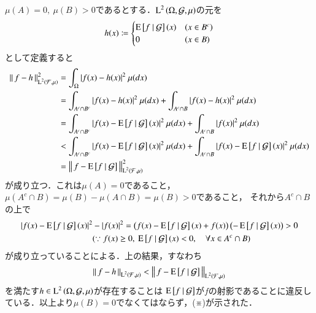 \begin{prf}
\begin{description}
				$\mu(A) = 0,\ \mu(B) > 0$であるとする．$\operatorname{L}^{2} \left(\Omega, \mathcal{G},\mu\right)$の元を
				\begin{align}
					h(x) \coloneqq
					\begin{cases}
						\operatorname{E} \left[ f \ \middle|\ \mathcal{G} \right](x) & (x \in B^c) \\
						0 & (x \in B)
					\end{cases}
				\end{align}
				として定義すると
				\begin{align}
					\Norm{f - h}{\Lp{2}{\mathcal{F},\mu}}^2 &= \int_{\Omega} |f(x) - h(x)|^2\ \mu(dx) \\
					&= \int_{A^c \cap B^c} |f(x) - h(x)|^2\ \mu(dx) + \int_{A^c \cap B} |f(x) - h(x)|^2\ \mu(dx) \\
					&= \int_{A^c \cap B^c} |f(x) - \cexp{f}{\mathcal{G}}(x)|^2\ \mu(dx) + \int_{A^c \cap B} |f(x)|^2\ \mu(dx) \\
					&< \int_{A^c \cap B^c} |f(x) - \cexp{f}{\mathcal{G}}(x)|^2\ \mu(dx) + \int_{A^c \cap B} |f(x) - \cexp{f}{\mathcal{G}}(x)|^2\ \mu(dx) \\
					&= \Norm{f - \cexp{f}{\mathcal{G}}}{\Lp{2}{\mathcal{F},\mu}}^2
				\end{align}
				が成り立つ．これは$\mu(A) = 0$であること，$\mu(A^c \cap B) = \mu(B) - \mu(A \cap B) = \mu(B) > 0$であること，
				それから$A^c \cap B$の上で
				\begin{align}
					|f(x) - \cexp{f}{\mathcal{G}}(x)|^2 &- |f(x)|^2 = \left(f(x) - \cexp{f}{\mathcal{G}}(x) + f(x)\right)\left(- \cexp{f}{\mathcal{G}}(x)\right) > 0 \\
					&(\because f(x) \geq 0,\ \cexp{f}{\mathcal{G}}(x) < 0, \quad \forall x \in A^c \cap B)
				\end{align}
				が成り立っていることによる．上の結果，すなわち
				\begin{align}
					\left\|\, f - h\, \right\|_{\operatorname{L}^{2} \left(\mathcal{F},\mu\right)} < \left\|\, f - \operatorname{E} \left[ f \ \middle|\ \mathcal{G} \right]\, \right\|_{\operatorname{L}^{2} \left(\mathcal{F},\mu\right)}
				\end{align}
				を満たす$h \in \operatorname{L}^{2} \left(\Omega, \mathcal{G},\mu\right)$が存在することは
				$\operatorname{E} \left[ f \ \middle|\ \mathcal{G} \right]$が$f$の射影であることに違反している．以上より$\mu(B) = 0$でなくてはならず，(※)が示された．
			

\end{description}
\end{prf}
